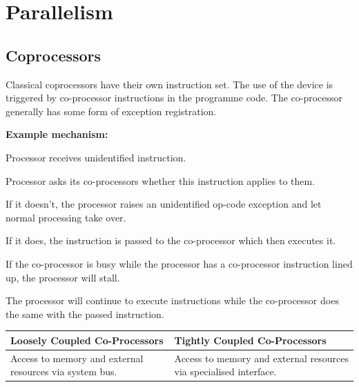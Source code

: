\section{Parallelism }
	\subsection{Coprocessors }
	
		Classical coprocessors have their own instruction set. The use of the device is triggered by co-processor instructions in the programme code. The co-processor generally has some form of exception registration.
		
		\vspace{0.5cm}
		
		\textbf{Example mechanism:}
		
		\begin{compactenum}
		  \item Processor receives unidentified instruction.
		  \item Processor asks its co-processors whether this instruction applies to them.
		  \begin{compactenum}
			  \item If it doesn't, the processor raises an unidentified op-code exception and let normal processing take over.
			  \item If it does, the instruction is passed to the co-processor which then executes it.
			  \item If the co-processor is busy while the processor has a co-processor instruction lined up, the processor will stall.
		  \end{compactenum}	  
		  \item The processor will continue to execute instructions while the co-processor does the same with the passed instruction.
		\end{compactenum}


		\begin{table}[H]
			\centering
			\begin{tabular}{|p{0.425\textwidth}|p{}|}
				\hline
				\textbf{Loosely Coupled Co-Processors}
					& \textbf{Tightly Coupled Co-Processors}\\
				\hline
				Access to memory and external resources via system bus.
					& Access to memory and external resources via specialised interface.\\
				\hline
			\end{tabular}
		\end{table}
		
